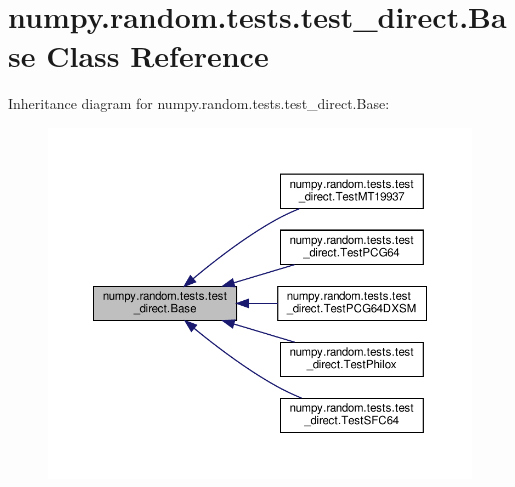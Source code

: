 \hypertarget{classnumpy_1_1random_1_1tests_1_1test__direct_1_1Base}{}\section{numpy.\+random.\+tests.\+test\+\_\+direct.\+Base Class Reference}
\label{classnumpy_1_1random_1_1tests_1_1test__direct_1_1Base}


Inheritance diagram for numpy.\+random.\+tests.\+test\+\_\+direct.\+Base\+:
\nopagebreak
\begin{figure}[H]
\begin{center}
\leavevmode
\includegraphics[width=350pt]{classnumpy_1_1random_1_1tests_1_1test__direct_1_1Base__inherit__graph}
\end{center}
\end{figure}

